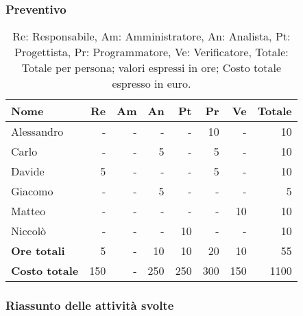 \subsubsection{Preventivo}

\begin{table}[H]
	\centering
	\begin{tabular}{l|r|r|r|r|r|r|r}
		\textbf{Nome}         & \textbf{Re} & \textbf{Am} & \textbf{An} & \textbf{Pt} & \textbf{Pr} & \textbf{Ve} & \textbf{Totale} \\
		\hline
		Alessandro            & -           & -           & -           & -           & 10          & -           & 10              \\
		Carlo                 & -           & -           & 5           & -           & 5           & -           & 10              \\
		Davide                & 5           & -           & -           & -           & 5           & -           & 10              \\
		Giacomo               & -           & -           & 5           & -           & -           & -           & 5               \\
		Matteo                & -           & -           & -           & -           & -           & 10          & 10              \\
		Niccolò               & -           & -           & -           & 10          & -           & -           & 10              \\
		\hline
		\textbf{Ore totali}   & 5           & -           & 10          & 10          & 20          & 10          & 55              \\
		\textbf{Costo totale} & 150         & -           & 250         & 250         & 300         & 150         & 1100
	\end{tabular}
	\caption{Re: Responsabile, Am: Amministratore, An: Analista, Pt: Progettista,
		Pr: Programmatore, Ve: Verificatore, Totale: Totale per persona; valori espressi in ore; Costo totale espresso in euro.}
\end{table}

\subsubsection{Riassunto delle attività svolte}

